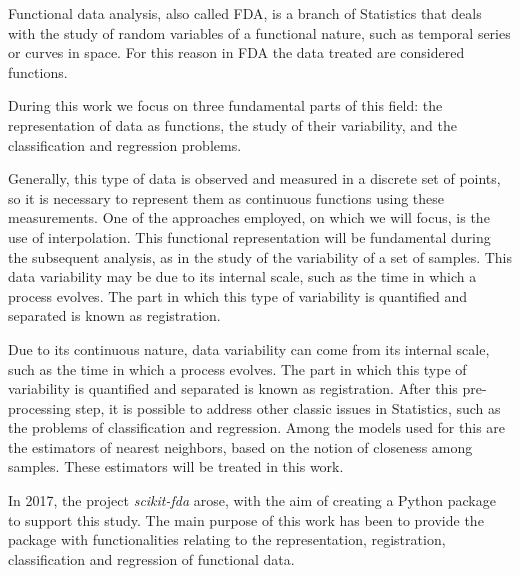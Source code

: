 Functional data analysis, also called FDA, is a branch of Statistics that deals
with the study of random variables of a functional nature, such as temporal
series or curves in space. For this reason in FDA the data treated are
considered functions.

During this work we focus on three fundamental parts of this field:
the representation of data as functions, the study of their variability,
and the classification and regression problems.

Generally, this type of data is observed and measured in a discrete set of
points, so it is necessary to represent them as continuous functions using
these measurements. One of the approaches employed, on which we will focus, is the
use of interpolation. This functional representation will be fundamental during
the subsequent analysis, as in the study of the variability of a set of samples.
This data variability may be due to its
internal scale, such as the time in which a process evolves.
The part in which this type of variability is quantified and separated is known
as registration.

Due to its continuous nature, data variability can come from its internal scale,
such as the time in which a process evolves. The part in which this
type of variability is quantified and separated is known as registration.
After this pre-processing step, it is possible to address other classic
issues in Statistics, such as the problems of classification and regression.
Among the models used for this are the estimators of nearest neighbors,
based on the notion of closeness among samples. These estimators
will be treated in this work.

In 2017, the project \textit{scikit-fda} arose, with the aim of creating a
Python package to support this study. The main purpose of this work has been to
provide the package with functionalities relating to the representation,
registration, classification and regression of functional data.
